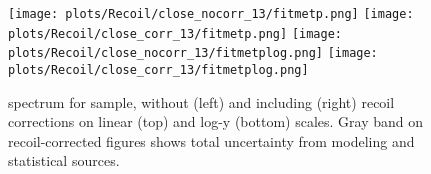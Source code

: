 \begin{figure}
\centering
\texttt{[image: plots/Recoil/close\_nocorr\_13/fitmetp.png]}
\texttt{[image: plots/Recoil/close\_corr\_13/fitmetp.png]}
\texttt{[image: plots/Recoil/close\_nocorr\_13/fitmetplog.png]}
\texttt{[image: plots/Recoil/close\_corr\_13/fitmetplog.png]}
\caption{\met spectrum for \zmm sample, without (left) and  including (right) recoil corrections on linear (top) and log-y (bottom) scales. Gray band on recoil-corrected figures shows total uncertainty from modeling and statistical sources.}
\label{fig:recoil:validation:met}
\end{figure}